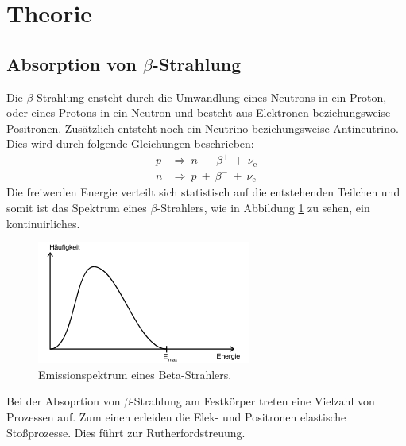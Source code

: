 \section{Theorie}
\label{sec:Theorie}
\subsection{Absorption von \texorpdfstring{$\beta$}{beta}-Strahlung}
Die $\beta$-Strahlung ensteht durch die Umwandlung eines Neutrons in ein Proton, oder eines Protons in ein Neutron und besteht aus Elektronen beziehungsweise Positronen.
Zusätzlich entsteht noch ein Neutrino beziehungsweise Antineutrino.
Dies wird durch folgende Gleichungen beschrieben:
\begin{align*}
  p & \Rightarrow \: n \: + \: {\beta}^{+} \: + \: \nu_\text{e} \\
  n & \Rightarrow \: p \: + \: {\beta}^{-} \: + \: \overline{\nu_\text{e}}
\end{align*}
Die freiwerden Energie verteilt sich statistisch auf die entstehenden Teilchen und somit ist das Spektrum eines $\beta$-Strahlers, wie in Abbildung \ref{fig:betaspektrum}
zu sehen, ein kontinuirliches.
\begin{figure}
  \centering
  \includegraphics{pictures/betaspektrum.png}
  \caption{Emissionspektrum eines Beta-Strahlers.\cite{sample}}
  \label{fig:betaspektrum}
\end{figure}
Bei der Absoprtion von $\beta$-Strahlung am Festkörper treten eine Vielzahl von Prozessen auf.
Zum einen erleiden die Elek- und Positronen elastische Stoßprozesse. Dies führt zur Rutherfordstreuung. 
